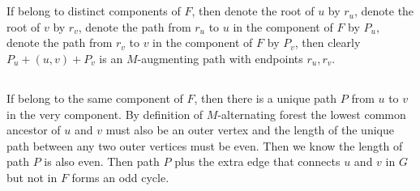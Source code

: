 \documentclass[12pt,letterpaper]{article}
\begin{document}
\newpage
\section{}
\subsection{}
If belong to distinct components of $F$,
then denote the root of $u$ by $r_{u}$, denote the root of $v$ by $r_{v}$,
denote the path from $r_{u}$ to $u$ in the component of $F$ by $P_{u}$,
denote the path from $r_{v}$ to $v$ in the component of $F$ by $P_{v}$,
then clearly $P_u+(u,v)+P_v$ is an $M$-augmenting path with endpoints $r_u,r_v$.

\subsection{}
If belong to the same component of $F$,
then there is a unique path $P$ from $u$ to $v$ in the very component.
By definition of $M$-alternating forest the lowest common ancestor of $u$ and $v$ must also be an outer vertex 
and the length of the unique path between any two outer vertices must be even.
Then we know the length of path $P$ is also even.
Then path $P$ plus the extra edge that connects $u$ and $v$ in $G$ but not in $F$
forms an odd cycle.

\newpage
\end{document}
